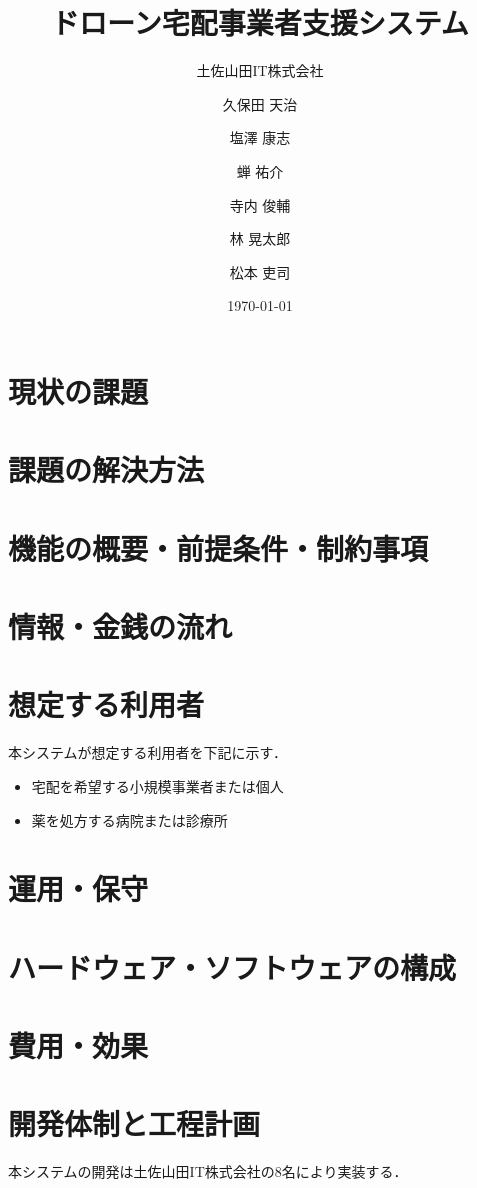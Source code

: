 \documentclass[a4paper, titlepage]{jsarticle}
\date{\today}
\title{ドローン宅配事業者支援システム}
\author{土佐山田IT株式会社 \and
        久保田 天治 \and 塩澤 康志 \and 蝉 祐介 \and 寺内 俊輔 \and 林 晃太郎 \and 松本 吏司}
\begin{document}
\maketitle

\tableofcontents

\clearpage

\section{現状の課題}

\section{課題の解決方法}

\section{機能の概要・前提条件・制約事項}

\section{情報・金銭の流れ}

\section{想定する利用者}
本システムが想定する利用者を下記に示す．
\begin{itemize}
        \item 宅配を希望する小規模事業者または個人
        \item 薬を処方する病院または診療所
\end{itemize}

\section{運用・保守}

\section{ハードウェア・ソフトウェアの構成}

\section{費用・効果}

\section{開発体制と工程計画}
本システムの開発は土佐山田IT株式会社の8名により実装する．
\end{document}
